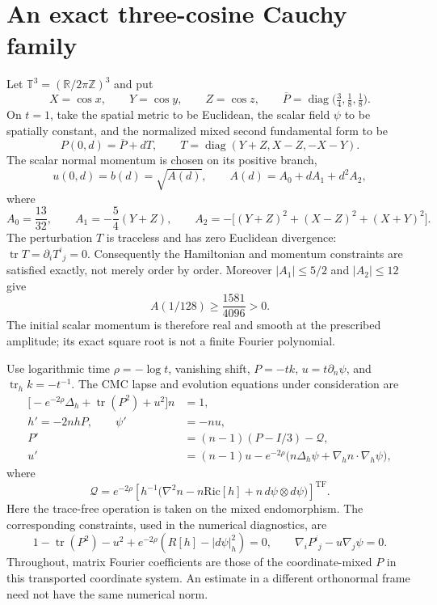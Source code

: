 \documentclass[11pt,a4paper]{article}
\theoremstyle{remark}
\newcommand{\T}{\mathbb T}
\newcommand{\pbar}{\overline P}
\newcommand{\TF}{\mathrm{TF}}
\newcommand{\Ric}{\mathrm{Ric}}
\begin{document}
\section{An exact three-cosine Cauchy family}
Let $\T^3=(\mathbb R/2\pi\mathbb Z)^3$ and put
\[
X=\cos x,\qquad Y=\cos y,\qquad Z=\cos z,\qquad
\pbar=\operatorname{diag}\bigl(\tfrac34,\tfrac18,\tfrac18\bigr).
\]
On $t=1$, take the spatial metric to be Euclidean, the scalar field $\psi$ to be spatially constant, and the normalized mixed second fundamental form to be
\begin{equation}\label{eq:data}
P(0,d)=\pbar+dT,\qquad
T=\operatorname{diag}(Y+Z,X-Z,-X-Y).
\end{equation}
The scalar normal momentum is chosen on its positive branch,
\begin{equation}\label{eq:scalarA}
u(0,d)=b(d)=\sqrt{A(d)},\qquad
A(d)=A_0+dA_1+d^2A_2,
\end{equation}
where
\begin{equation}\label{eq:Adata}
A_0=\frac{13}{32},\qquad
A_1=-\frac54(Y+Z),\qquad
A_2=-\bigl[(Y+Z)^2+(X-Z)^2+(X+Y)^2\bigr].
\end{equation}
The perturbation $T$ is traceless and has zero Euclidean divergence: $\operatorname{tr}T=\partial_iT^i{}_j=0$. Consequently the Hamiltonian and momentum constraints are satisfied exactly, not merely order by order. Moreover $|A_1|\leq5/2$ and $|A_2|\leq12$ give
\[
A(1/128)\geq\frac{1581}{4096}>0.
\]
The initial scalar momentum is therefore real and smooth at the prescribed amplitude; its exact square root is not a finite Fourier polynomial.

Use logarithmic time $\rho=-\log t$, vanishing shift, $P=-tk$, $u=t\partial_n\psi$, and $\operatorname{tr}_h k=-t^{-1}$. The CMC lapse and evolution equations under consideration are
\begin{align}\label{eq:CMCevol}
\bigl[-e^{-2\rho}\Delta_h+\operatorname{tr}(P^2)+u^2\bigr]n&=1,\\
h'=-2nhP,\qquad \psi'&=-nu,\nonumber\\
P'&=(n-1)(P-I/3)-\mathcal Q,\nonumber\\
u'&=(n-1)u-e^{-2\rho}\bigl(n\Delta_h\psi+\nabla_hn\cdot\nabla_h\psi\bigr),\nonumber
\end{align}
where
\begin{equation}\label{eq:Q}
\mathcal Q=e^{-2\rho}
\left[h^{-1}\bigl(\nabla^2n-n\Ric[h]+n\,d\psi\otimes d\psi\bigr)\right]^{\TF}.
\end{equation}
Here the trace-free operation is taken on the mixed endomorphism. The corresponding constraints, used in the numerical diagnostics, are
\begin{equation}\label{eq:constraints}
1-\operatorname{tr}(P^2)-u^2+e^{-2\rho}(R[h]-|d\psi|_h^2)=0,
\qquad \nabla_iP^i{}_j-u\nabla_j\psi=0.
\end{equation}
Throughout, matrix Fourier coefficients are those of the coordinate-mixed $P$ in this transported coordinate system. An estimate in a different orthonormal frame need not have the same numerical norm.
\end{document}
